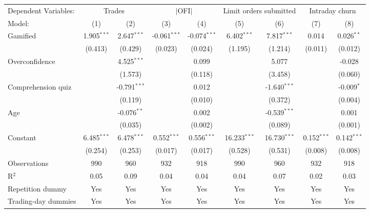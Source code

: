 \begin{tabular}{lcccccccc}
   \tabularnewline \midrule \midrule
   Dependent Variables: & \multicolumn{2}{c}{Trades} & \multicolumn{2}{c}{$|$OFI$|$} & \multicolumn{2}{c}{Limit orders submitted} & \multicolumn{2}{c}{Intraday churn}\\
   Model:              & (1)           & (2)            & (3)            & (4)            & (5)            & (6)            & (7)           & (8)\\  
   \midrule
   Gamified            & 1.905$^{***}$ & 2.647$^{***}$  & -0.061$^{***}$ & -0.074$^{***}$ & 6.402$^{***}$  & 7.817$^{***}$  & 0.014         & 0.026$^{**}$\\   
                       & (0.413)       & (0.429)        & (0.023)        & (0.024)        & (1.195)        & (1.214)        & (0.011)       & (0.012)\\   
   Overconfidence      &               & 4.525$^{***}$  &                & 0.099          &                & 5.077          &               & -0.028\\   
                       &               & (1.573)        &                & (0.118)        &                & (3.458)        &               & (0.060)\\   
   Comprehension quiz  &               & -0.791$^{***}$ &                & 0.012          &                & -1.640$^{***}$ &               & -0.009$^{*}$\\   
                       &               & (0.119)        &                & (0.010)        &                & (0.372)        &               & (0.004)\\   
   Age                 &               & -0.076$^{**}$  &                & 0.002          &                & -0.539$^{***}$ &               & 0.001\\   
                       &               & (0.035)        &                & (0.002)        &                & (0.089)        &               & (0.001)\\   
   Constant            & 6.485$^{***}$ & 6.478$^{***}$  & 0.552$^{***}$  & 0.556$^{***}$  & 16.233$^{***}$ & 16.730$^{***}$ & 0.152$^{***}$ & 0.142$^{***}$\\   
                       & (0.254)       & (0.253)        & (0.017)        & (0.017)        & (0.528)        & (0.531)        & (0.008)       & (0.008)\\   
   \midrule
   Observations        & 990           & 960            & 932            & 918            & 990            & 960            & 932           & 918\\  
   R$^2$               & 0.05          & 0.09           & 0.04           & 0.04           & 0.04           & 0.07           & 0.02          & 0.03\\  
   Repetition dummy    & Yes           & Yes            & Yes            & Yes            & Yes            & Yes            & Yes           & Yes\\  
   Trading-day dummies & Yes           & Yes            & Yes            & Yes            & Yes            & Yes            & Yes           & Yes\\  
   \midrule \midrule
\end{tabular}
